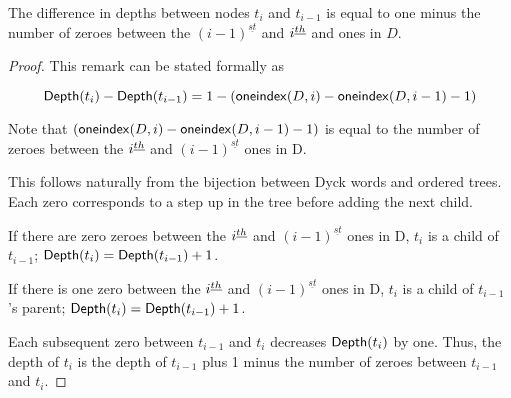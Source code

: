 \begin{remark} The difference in depths between nodes $t_i$ and $t_{i-1}$ is equal to one minus the number of zeroes between the $(i-1)^{\underline{st}}$ and $i^{\underline{th}}$ and  ones in $D$.


\end{remark}
\begin{proof}

    This remark can be stated formally as 

    \begin{equation} \label{eq:depthformula} 
    	\mathsf{Depth}{(t_i)} - \mathsf{Depth}{(t_{i-1})}=1-(\mathsf{oneindex}({D}, i)-\mathsf{oneindex}({D}, i-1) - 1) 
    \end{equation}
    


    

    Note that $(\mathsf{oneindex}({D}, i)-\mathsf{oneindex}({D}, i-1)-1)$ is equal to the number of zeroes between the $i^{\underline{th}}$ and $(i-1)^{\underline{st}}$ ones in D.  %



    This follows naturally from the bijection between Dyck words and ordered trees.  Each zero corresponds to a step up in the tree before adding the next child.  

    If there are zero zeroes between the $i^{\underline{th}}$  and $(i-1)^{\underline{st}}$ ones in D, $t_i$ is a child of $t_{i-1}$; $\mathsf{Depth}{(t_i)}=\mathsf{Depth}{(t_{i-1})}+1$.

    If there is one zero between the $i^{\underline{th}}$  and $(i-1)^{\underline{st}}$ ones in D, $t_i$ is a child of $t_{i-1}$'s parent; $\mathsf{Depth}{(t_i)}=\mathsf{Depth}{(t_{i-1})}+1$.  

    Each subsequent zero between $t_{i-1}$ and $t_i$ decreases $\mathsf{Depth}{(t_{i})}$ by one.  Thus, the depth of $t_i$ is the depth of $t_{i-1}$ plus 1 minus the number of zeroes between $t_{i-1}$ and $t_{i}$.
\end{proof}


